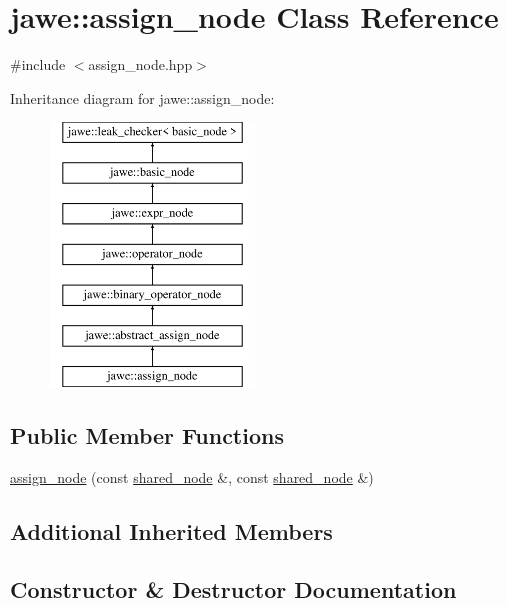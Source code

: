\hypertarget{classjawe_1_1assign__node}{}\section{jawe\+:\+:assign\+\_\+node Class Reference}
\label{classjawe_1_1assign__node}


{\ttfamily \#include $<$assign\+\_\+node.\+hpp$>$}

Inheritance diagram for jawe\+:\+:assign\+\_\+node\+:\begin{figure}[H]
\begin{center}
\leavevmode
\includegraphics[height=7.000000cm]{classjawe_1_1assign__node}
\end{center}
\end{figure}
\subsection*{Public Member Functions}
\begin{DoxyCompactItemize}
\item 
\hyperlink{classjawe_1_1assign__node_a68c98f0414966b2fafca90bb6a7e8725}{assign\+\_\+node} (const \hyperlink{namespacejawe_a3f307481d921b6cbb50cc8511fc2b544}{shared\+\_\+node} \&, const \hyperlink{namespacejawe_a3f307481d921b6cbb50cc8511fc2b544}{shared\+\_\+node} \&)
\end{DoxyCompactItemize}
\subsection*{Additional Inherited Members}


\subsection{Constructor \& Destructor Documentation}
\mbox{\label{classjawe_1_1assign__node_a68c98f0414966b2fafca90bb6a7e8725}} 
